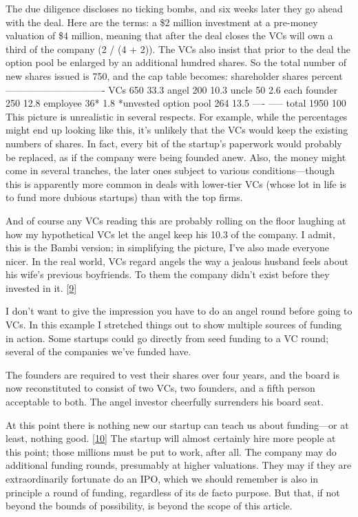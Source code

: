 The due diligence discloses no ticking bombs, and six weeks later they
go ahead with the deal. Here are the terms: a \$2 million investment at
a pre-money valuation of \$4 million, meaning that after the deal closes
the VCs will own a third of the company (2 / (4 + 2)). The VCs also
insist that prior to the deal the option pool be enlarged by an
additional hundred shares. So the total number of new shares issued is
750, and the cap table becomes: shareholder shares percent
------------------------------- VCs 650 33.3 angel 200 10.3 uncle 50 2.6
each founder 250 12.8 employee 36* 1.8 *unvested option pool 264 13.5
---- ----- total 1950 100 This picture is unrealistic in several
respects. For example, while the percentages might end up looking like
this, it's unlikely that the VCs would keep the existing numbers of
shares. In fact, every bit of the startup's paperwork would probably be
replaced, as if the company were being founded anew. Also, the money
might come in several tranches, the later ones subject to various
conditions---though this is apparently more common in deals with
lower-tier VCs (whose lot in life is to fund more dubious startups) than
with the top firms.

And of course any VCs reading this are probably rolling on the floor
laughing at how my hypothetical VCs let the angel keep his 10.3 of the
company. I admit, this is the Bambi version; in simplifying the picture,
I've also made everyone nicer. In the real world, VCs regard angels the
way a jealous husband feels about his wife's previous boyfriends. To
them the company didn't exist before they invested in it.
{[}\hyperref[f9n]{9}{]}

I don't want to give the impression you have to do an angel round before
going to VCs. In this example I stretched things out to show multiple
sources of funding in action. Some startups could go directly from seed
funding to a VC round; several of the companies we've funded have.

The founders are required to vest their shares over four years, and the
board is now reconstituted to consist of two VCs, two founders, and a
fifth person acceptable to both. The angel investor cheerfully
surrenders his board seat.

At this point there is nothing new our startup can teach us about
funding---or at least, nothing good. {[}\hyperref[f10n]{10}{]} The
startup will almost certainly hire more people at this point; those
millions must be put to work, after all. The company may do additional
funding rounds, presumably at higher valuations. They may if they are
extraordinarily fortunate do an IPO, which we should remember is also in
principle a round of funding, regardless of its de facto purpose. But
that, if not beyond the bounds of possibility, is beyond the scope of
this article.

